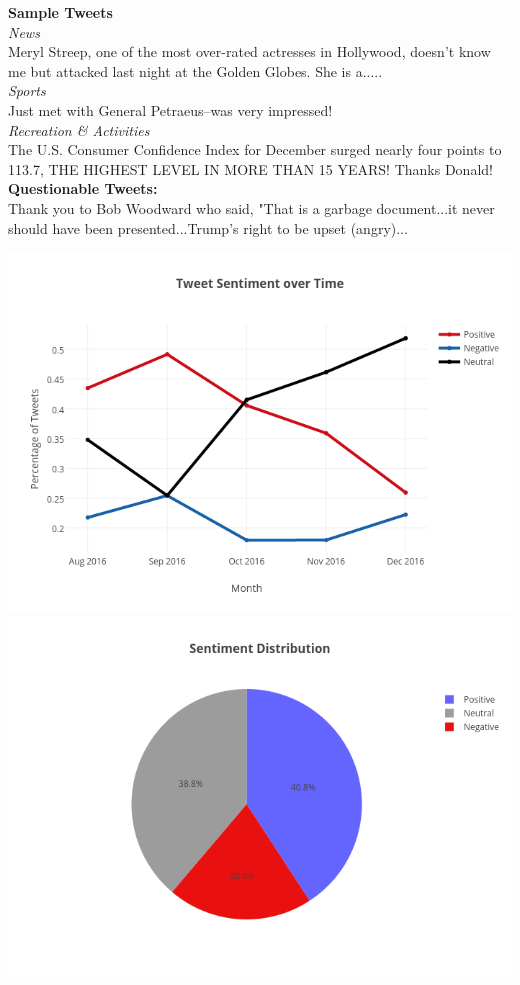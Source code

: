 \documentclass[12pt]{article}
\begin{document}
\textbf{Sample Tweets}\\
\bigbreak
\noindent \large \textit{News}\\
Meryl Streep, one of the most over-rated actresses in Hollywood, doesn't know me but attacked last night at the Golden Globes. She is a.....\\
\smallbreak
\noindent \large \textit{Sports}\\
Just met with General Petraeus--was very impressed!\\
\smallbreak
\noindent \large \textit{Recreation \& Activities}\\
The U.S. Consumer Confidence Index for December surged nearly four points to 113.7, THE HIGHEST LEVEL IN MORE THAN 15 YEARS! Thanks Donald!\\
\smallbreak
\noindent \textbf{Questionable Tweets:}\\
Thank you to Bob Woodward who said, "That is a garbage document...it never should have been presented...Trump's right to be upset (angry)...\\
\newpage
\begin{center}
\includegraphics[width=1.0\textwidth]{sentiment_over_time.png}
\bigbreak
\includegraphics[width=0.8 \textwidth]{sentiment_pie_chart.png}\\
\end{center}
\end{document}
